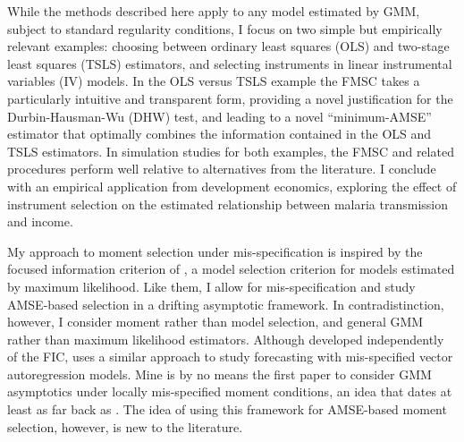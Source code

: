 While the methods described here apply to any model estimated by GMM, subject to standard regularity conditions, I focus on two simple but empirically relevant examples: choosing between ordinary least squares (OLS) and two-stage least squares (TSLS) estimators, and selecting instruments in linear instrumental variables (IV) models. 
In the OLS versus TSLS example the FMSC takes a particularly intuitive and transparent form, providing a novel justification for the Durbin-Hausman-Wu (DHW) test, and leading to a novel ``minimum-AMSE'' estimator that optimally combines the information contained in the OLS and TSLS estimators.
In simulation studies for both examples, the FMSC and related procedures perform well relative to alternatives from the literature. 
I conclude with an empirical application from development economics, exploring the effect of instrument selection on the estimated relationship between malaria transmission and income.

My approach to moment selection under mis-specification is inspired by the focused information criterion of \citet{ClaeskensHjort2003}, a model selection criterion for models estimated by maximum likelihood. 
Like them, I allow for mis-specification and study AMSE-based selection in a drifting asymptotic framework. 
In contradistinction, however, I consider moment rather than model selection, and general GMM rather than maximum likelihood estimators.
Although developed independently of the FIC, \cite{Schorfheide2005} uses a similar approach to study forecasting with mis-specified vector autoregression models.
Mine is by no means the first paper to consider GMM asymptotics under locally mis-specified moment conditions, an idea that dates at least as far back as \cite{Newey1985}.
The idea of using this framework for AMSE-based moment selection, however, is new to the literature. 


